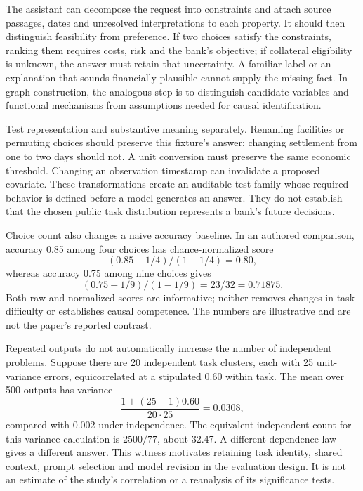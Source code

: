 The assistant can decompose the request into constraints and attach source passages, dates and unresolved interpretations to each property. It should then distinguish feasibility from preference. If two choices satisfy the constraints, ranking them requires costs, risk and the bank's objective; if collateral eligibility is unknown, the answer must retain that uncertainty. A familiar label or an explanation that sounds financially plausible cannot supply the missing fact. In graph construction, the analogous step is to distinguish candidate variables and functional mechanisms from assumptions needed for causal identification.~\citep{exec24_affordance_fuzzing_reference}

Test representation and substantive meaning separately. Renaming facilities or permuting choices should preserve this fixture's answer; changing settlement from one to two days should not. A unit conversion must preserve the same economic threshold. Changing an observation timestamp can invalidate a proposed covariate. These transformations create an auditable test family whose required behavior is defined before a model generates an answer. They do not establish that the chosen public task distribution represents a bank's future decisions.~\citep{exec24_affordance_fuzzing_reference}

Choice count also changes a naive accuracy baseline. In an authored comparison, accuracy 0.85 among four choices has chance-normalized score
\[
 (0.85-1/4)/(1-1/4)=0.80,
\]
whereas accuracy 0.75 among nine choices gives
\[
 (0.75-1/9)/(1-1/9)=23/32=0.71875.
\]
Both raw and normalized scores are informative; neither removes changes in task difficulty or establishes causal competence. The numbers are illustrative and are not the paper's reported contrast.~\citep{exec24_affordance_fuzzing_reference}

Repeated outputs do not automatically increase the number of independent problems. Suppose there are 20 independent task clusters, each with 25 unit-variance errors, equicorrelated at a stipulated 0.60 within task. The mean over 500 outputs has variance
\[
 \frac{1+(25-1)0.60}{20\cdot25}=0.0308,
\]
compared with 0.002 under independence. The equivalent independent count for this variance calculation is $2500/77$, about 32.47. A different dependence law gives a different answer. This witness motivates retaining task identity, shared context, prompt selection and model revision in the evaluation design. It is not an estimate of the study's correlation or a reanalysis of its significance tests.~\citep{exec24_affordance_fuzzing_reference}

